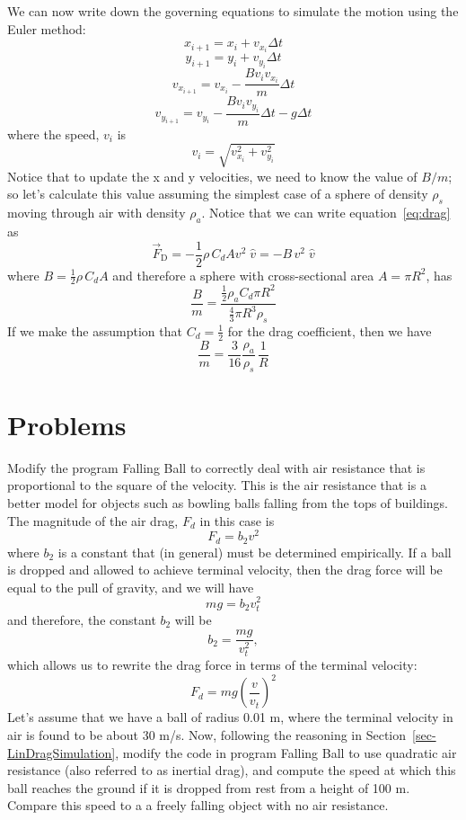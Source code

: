 We can now write down the governing equations to simulate the motion using the Euler method: 
$$ x_{i+1} = x_i + v_{x_i} \Delta t $$
$$ y_{i+1} = y_i + v_{y_i} \Delta t $$
$$ v_{x_{i+1}} = v_{x_i} - \frac{B v_i v_{x_i}}{m}\Delta t $$
$$ v_{y_{i+1}} = v_{y_i} - \frac{B v_i v_{y_i}}{m}\Delta t - g\Delta t $$
where the speed, $v_i$ is 
$$v_i = \sqrt{v^2_{x_i} + v^2_{y_i}}$$
Notice that to update the x and y velocities, we need to know the value of $B/m$; so let's calculate this value assuming the simplest case of a sphere of density $\rho_s$ moving through air with density $\rho_a$. Notice that we can write equation~\ref{eq:drag} as
\begin{equation} 
\vec{F}_{\mathrm{D}} = - \frac{1}{2}\rho \,C_d A v^2 \;\hat{v} = -B \, v^2 \;\hat{v}
\label{eq:dragModified}
\end{equation}
where $B=\frac{1}{2}\rho \,C_d A$ and therefore a sphere with cross-sectional area $A = \pi R^2$, has 
\begin{equation}
	\frac{B}{m} = \frac{\frac{1}{2}\rho_a C_d \pi R^2}{\frac{4}{3}\pi R^3 \rho_s}
\end{equation}
If we make the assumption that $C_d = \frac{1}{2}$ for the drag coefficient, then we have 
\begin{equation} 
	\frac{B}{m} = \frac{3}{16} \frac{\rho_a}{\rho_s} \, \frac{1}{R}
\end{equation}


\pagebreak 

\section*{Problems}
%

\begin{prob}
\label{prob2.1}
Modify the program \textsf{Falling Ball} to correctly deal with air resistance that is proportional to the square of the velocity. This is the air resistance that is a better model for objects such as bowling balls falling from the tops of buildings.  
The magnitude of the air drag, $F_d$ in this case is 
$$ F_d = b_2 v^2 $$
where $b_2$ is a constant that (in general) must be determined empirically. If a ball is dropped and allowed to achieve terminal velocity, then the drag force will be equal to the pull of gravity, and we will have
$$ mg = b_2 v_{t}^2$$
and therefore, the constant $b_2$ will be 
$$ b_2 = \frac{mg}{v_{t}^2},$$
which allows us to rewrite the drag force in terms of the terminal velocity:
$$ F_d = mg \left(\frac{v}{v_t}\right)^2 $$
Let's assume that we have a ball of radius 0.01 m, where the terminal velocity in air is found to be about 30 m/s. Now, following the reasoning in Section~\ref{sec-LinDragSimulation}, modify the code in program \textsf{Falling Ball} to use quadratic air resistance (also referred to as inertial drag), and compute the speed at which this ball reaches the ground if it is dropped from rest from a height of 100 m. Compare this speed to a a freely falling object with no air resistance. 
\end{prob}

